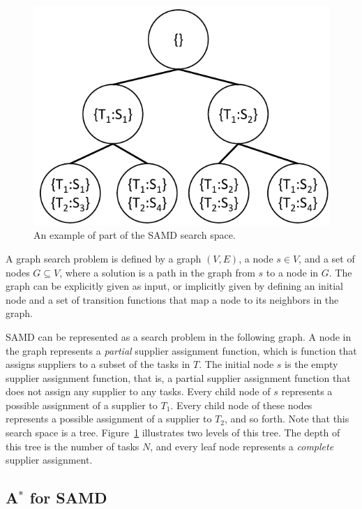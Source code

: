 \documentclass[letterpaper]{article} %
\newcommand{\samd}{\ac{SAMD}\xspace}
\begin{document}
\begin{figure}
    \centering
    \includegraphics[width=0.6\columnwidth]{search-space-samd_cropped.pdf}
    \caption{An example of part of the \samd search space.}
    \label{fig:search-space}
\end{figure}

A graph search problem is defined by a graph $(V,E)$,
a node $s\in V$, and a set of nodes $G\subseteq V$,
where a solution is a path in the graph from $s$ to a node in $G$.
The graph can be explicitly given as input, or implicitly given
by defining an initial node and a set of transition functions
that map a node to its neighbors in the graph.

\samd can be represented as a search problem in the following graph. A node in the graph represents a \emph{partial} supplier assignment function,
which is function that assigns suppliers to a subset of the tasks in $T$.
The initial node $s$ is the empty supplier assignment function, that is, a partial supplier assignment function that does not assign any supplier to any tasks.
Every child node of $s$ represents a possible assignment of a supplier to $T_1$.
Every child node of these nodes represents a possible assignment of a supplier to $T_2$,
and so forth. Note that this search space is a tree. Figure~\ref{fig:search-space} illustrates two levels of this tree.
The depth of this tree is the number of tasks $N$, and every leaf node represents a \emph{complete} supplier assignment.


\subsection{A$^*$ for \samd}
\label{sec:astar}
\end{document}
